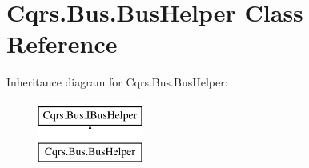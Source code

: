 \hypertarget{classCqrs_1_1Bus_1_1BusHelper}{}\section{Cqrs.\+Bus.\+Bus\+Helper Class Reference}
\label{classCqrs_1_1Bus_1_1BusHelper}
Inheritance diagram for Cqrs.\+Bus.\+Bus\+Helper\+:\begin{figure}[H]
\begin{center}
\leavevmode
\includegraphics[height=2.000000cm]{classCqrs_1_1Bus_1_1BusHelper}
\end{center}
\end{figure}
